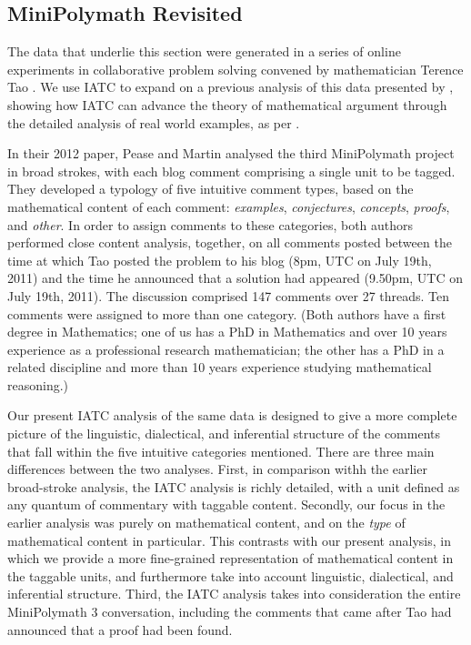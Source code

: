 \documentclass[smallextended,oneside]{svjour3}       %
\newcommand\nothing[1]{#1}
\let\thesis\nothing
\begin{document}

\subsection{MiniPolymath Revisited}\label{iatc-examples:minipolymath}

The data that underlie this section were generated in a series of online experiments in collaborative problem solving convened by mathematician Terence Tao \citeyearpar{tao2009imo,tao2011imo}.
\thesis{We use IATC to expand on a previous analysis of
  this data presented by \citet{pease-and-martin},} showing how IATC can
advance the theory of mathematical argument through the
detailed analysis of real world examples, as per \citet{Carrascal2015}.

In their 2012 paper,
Pease and Martin analysed the third MiniPolymath project in broad strokes,
with each blog comment comprising a single unit to be tagged.
They developed a typology of five intuitive comment types, based on
the mathematical content of each comment: \emph{examples},
\emph{conjectures}, \emph{concepts}, \emph{proofs}, and \emph{other}.
In order to assign comments to these categories, both authors
performed close content analysis, together, on all comments posted
between the time at which Tao posted the problem to his blog
(8pm, UTC on July 19th, 2011) and the time he announced
that a solution had appeared (9.50pm, UTC on July 19th, 2011).
The discussion comprised 147 comments over 27 threads.
Ten comments were assigned to more than one category.
(Both authors have a first degree in
Mathematics; one of us has a PhD in Mathematics and over 10 years
experience as a professional research mathematician; the other has a
PhD in a related discipline and more than 10 years experience studying
mathematical reasoning.)

Our present IATC analysis of the same data is designed to give a more complete picture of the
linguistic, dialectical, and inferential structure of the comments
that fall within the five intuitive categories mentioned.  There are three main
differences between the two analyses.  First, in comparison withh the earlier
broad-stroke analysis, the IATC analysis is richly detailed, with a
unit defined as any quantum of commentary with taggable
content.  Secondly, our focus in the earlier analysis was purely on
mathematical content, and on the {\em type} of mathematical
content in particular.  This contrasts with our
present analysis, in which we provide a more fine-grained representation of mathematical
content in the taggable units, and furthermore take into account
linguistic, dialectical, and inferential structure.
Third, the IATC analysis takes into consideration the entire
MiniPolymath 3 conversation, including the comments that came after
Tao had announced that a proof had been found.
\end{document}
